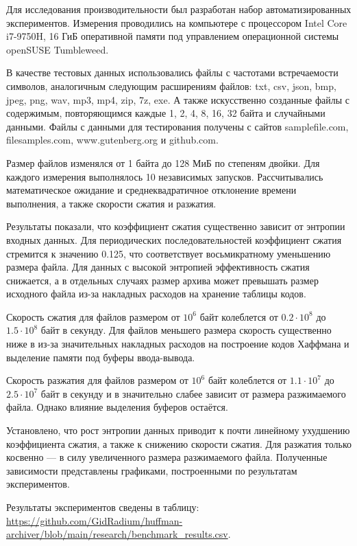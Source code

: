 \documentclass[a4paper]{article}
\begin{document}
Для исследования производительности был разработан набор автоматизированных экспериментов. Измерения проводились на компьютере с процессором Intel Core i7-9750H, 16 ГиБ оперативной памяти под управлением операционной системы openSUSE Tumbleweed.

В качестве тестовых данных использовались файлы с частотами встречаемости символов, аналогичным следующим расширениям файлов: txt, csv, json, bmp, jpeg, png, wav, mp3, mp4, zip, 7z, exe.
А также искусственно созданные файлы с содержимым, повторяющимся каждые 1, 2, 4, 8, 16, 32 байта и случайными данными.
Файлы с данными для тестирования получены с сайтов samplefile.com, filesamples.com, www.gutenberg.org и github.com.

Размер файлов изменялся от 1 байта до 128 МиБ по степеням двойки. Для каждого измерения выполнялось 10 независимых запусков. Рассчитывались математическое ожидание и среднеквадратичное отклонение времени выполнения, а также скорости сжатия и разжатия.

Результаты показали, что коэффициент сжатия существенно зависит от энтропии входных данных. Для периодических последовательностей коэффициент сжатия стремится к значению 0.125, что соответствует восьмикратному уменьшению размера файла. Для данных с высокой энтропией эффективность сжатия снижается, а в отдельных случаях размер архива может превышать размер исходного файла из-за накладных расходов на хранение таблицы кодов.

Скорость сжатия для файлов размером от $10^6$ байт колеблется от $0.2 \cdot 10^8$ до $1.5 \cdot 10^8$ байт в секунду. Для файлов меньшего размера скорость существенно ниже в из-за значительных накладных расходов на построение кодов Хаффмана и выделение памяти под буферы ввода-вывода.

Скорость разжатия для файлов размером от $10^6$ байт колеблется от $1.1 \cdot 10^7$ до $2.5 \cdot 10^7$ байт в секунду и в значительно слабее зависит от размера разжимаемого файла. Однако влияние выделения буферов остаётся.

Установлено, что рост энтропии данных приводит к почти линейному ухудшению коэффициента сжатия, а также к снижению скорости сжатия. Для разжатия только косвенно --- в силу увеличенного размера разжимаемого файла. Полученные зависимости представлены графиками, построенными по результатам экспериментов.

Результаты экспериментов сведены в таблицу:
\url{https://github.com/GidRadium/huffman-archiver/blob/main/research/benchmark_results.csv}.
\end{document}
